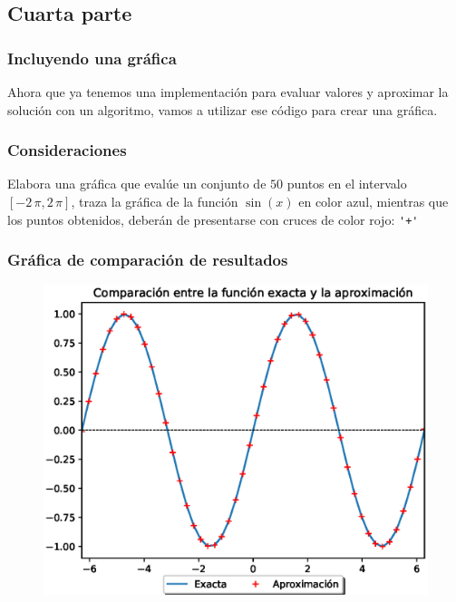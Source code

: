 \subsection{Cuarta parte}
\begin{frame}[fragile]
\frametitle{Incluyendo una gráfica}
Ahora que ya tenemos una implementación para evaluar valores y aproximar la solución con un algoritmo, vamos a utilizar ese código para crear una gráfica.
\end{frame}
\begin{frame}[fragile]
\frametitle{Consideraciones}
Elabora una gráfica que evalúe un conjunto de $50$ puntos en el intervalo $[-2 \, \pi, 2 \, \pi]$, traza la gráfica de la función $\sin (x)$ en color azul, mientras que los puntos obtenidos, deberán de presentarse con cruces de color rojo: \verb|'+'|
\end{frame}
\begin{frame}[fragile]
\frametitle{Gráfica de comparación de resultados}
\begin{figure}
    \centering
    \includegraphics[scale=0.6]{Imagenes/Aproximacion_Seno.eps}
\end{figure}
\end{frame}
